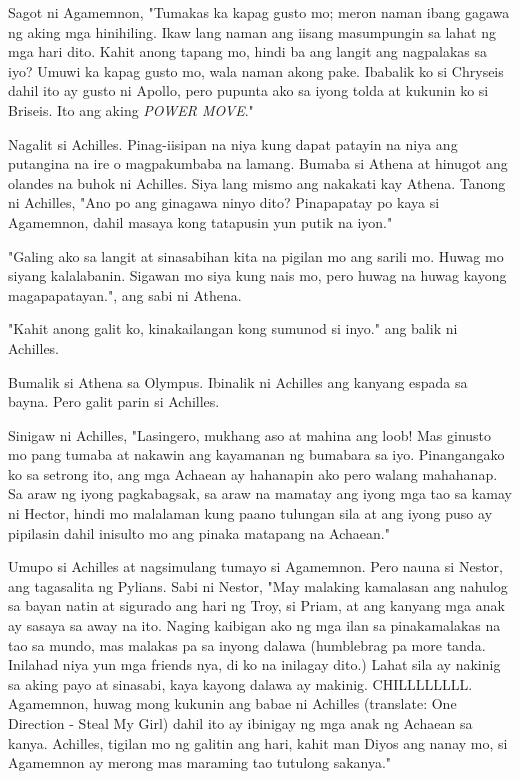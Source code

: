 \documentclass[12pt,letterpaper]{report}
\begin{document}
Sagot ni Agamemnon, "Tumakas ka kapag gusto mo; meron naman ibang gagawa ng aking mga hinihiling.
Ikaw lang naman ang iisang masumpungin sa lahat ng mga hari dito. Kahit anong tapang mo, hindi ba ang langit ang nagpalakas sa iyo?
Umuwi ka kapag gusto mo, wala naman akong pake. Ibabalik ko si Chryseis dahil ito ay gusto ni Apollo,
pero pupunta ako sa iyong tolda at kukunin ko si Briseis. Ito ang aking \textit{POWER MOVE}."

Nagalit si Achilles. Pinag-iisipan na niya kung dapat patayin na niya ang putangina na ire o magpakumbaba na lamang.
Bumaba si Athena at hinugot ang olandes na buhok ni Achilles. Siya lang mismo ang nakakati kay Athena.
Tanong ni Achilles, "Ano po ang ginagawa ninyo dito? Pinapapatay po kaya si Agamemnon, dahil masaya kong tatapusin yun putik na iyon."

"Galing ako sa langit at sinasabihan kita na pigilan mo ang sarili mo. Huwag mo siyang kalalabanin.
Sigawan mo siya kung nais mo, pero huwag na huwag kayong magapapatayan.", ang sabi ni Athena.

"Kahit anong galit ko, kinakailangan kong sumunod si inyo." ang balik ni Achilles.

Bumalik si Athena sa Olympus. Ibinalik ni Achilles ang kanyang espada sa bayna. Pero galit parin si Achilles.

Sinigaw ni Achilles, "Lasingero, mukhang aso at mahina ang loob!
Mas ginusto mo pang tumaba at nakawin ang kayamanan ng bumabara sa iyo. Pinangangako ko sa setrong ito,
ang mga Achaean ay hahanapin ako pero walang mahahanap. Sa araw ng iyong pagkabagsak,
sa araw na mamatay ang iyong mga tao sa kamay ni Hector, hindi mo malalaman kung paano tulungan sila at ang iyong
puso ay pipilasin dahil inisulto mo ang pinaka matapang na Achaean."

Umupo si Achilles at nagsimulang tumayo si Agamemnon. Pero nauna si Nestor, ang tagasalita ng Pylians. Sabi ni Nestor,
"May malaking kamalasan ang nahulog sa bayan natin at sigurado ang hari ng Troy, si Priam,
at ang kanyang mga anak ay sasaya sa away na ito. Naging kaibigan ako ng mga ilan sa pinakamalakas na tao sa mundo,
mas malakas pa sa inyong dalawa (humblebrag pa more tanda. Inilahad niya yun mga friends nya, di ko na inilagay dito.)
Lahat sila ay nakinig sa aking payo at sinasabi, kaya kayong dalawa ay makinig. CHILLLLLLLL. Agamemnon, huwag mong kukunin
ang babae ni Achilles (translate: One Direction - Steal My Girl) dahil ito ay ibinigay ng mga anak ng Achaean sa kanya.
Achilles, tigilan mo ng galitin ang hari, kahit man Diyos ang nanay mo, si Agamemnon ay merong mas maraming tao tutulong sakanya."
\end{document}
